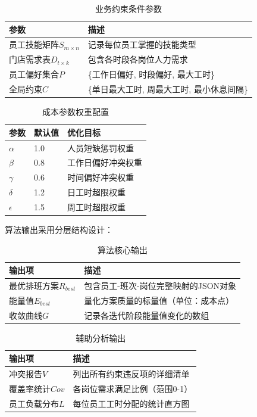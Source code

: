 \documentclass{ctexart}
\begin{document}
\begin{table}[H]
    \centering
    \caption{业务约束条件参数}
    \label{tab:business-constraints}
    \begin{tabular}{ll}
    \toprule
    参数 & 描述 \\
    \midrule
    员工技能矩阵$S_{m×n}$ & 记录每位员工掌握的技能类型 \\
    门店需求表$D_{t×k}$ & 包含各时段各岗位人力需求 \\
    员工偏好集合$P$ & \{工作日偏好, 时段偏好, 最大工时\} \\
    全局约束$C$ & \{单日最大工时, 周最大工时, 最小休息间隔\} \\
    \bottomrule
    \end{tabular}
\end{table}

\begin{table}[H]
    \centering
    \caption{成本参数权重配置}
    \label{tab:cost-weights}
    \begin{tabular}{lll}
    \toprule
    参数 & 默认值 & 优化目标 \\
    \midrule
    $\alpha$ & 1.0 & 人员短缺惩罚权重 \\
    $\beta$ & 0.8 & 工作日偏好冲突权重 \\
    $\gamma$ & 0.6 & 时间偏好冲突权重 \\
    $\delta$ & 1.2 & 日工时超限权重 \\
    $\epsilon$ & 1.5 & 周工时超限权重 \\
    \bottomrule
    \end{tabular}
\end{table}

算法输出采用分层结构设计：

\begin{table}[H]
    \centering
    \caption{算法核心输出}
    \label{tab:core-outputs}
    \begin{tabular}{ll}
    \toprule
    输出项 & 描述 \\
    \midrule
    最优排班方案$R_{best}$ & 包含员工-班次-岗位完整映射的JSON对象 \\
    能量值$E_{best}$ & 量化方案质量的标量值（单位：成本点） \\
    收敛曲线$G$ & 记录各迭代阶段能量值变化的数组 \\
    \bottomrule
    \end{tabular}
\end{table}

\begin{table}[H]
    \centering
    \caption{辅助分析输出}
    \label{tab:aux-outputs}
    \begin{tabular}{ll}
    \toprule
    输出项 & 描述 \\
    \midrule
    冲突报告$V$ & 列出所有约束违反项的详细清单 \\
    覆盖率统计$Cov$ & 各岗位需求满足比例（范围0-1） \\
    员工负载分布$L$ & 每位员工工时分配的统计直方图 \\
    \bottomrule
    \end{tabular}
\end{table}
\end{document}
